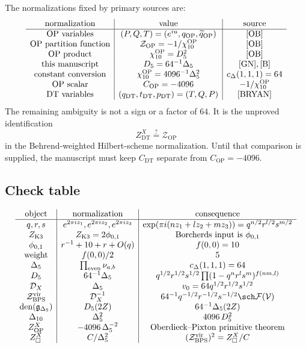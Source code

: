 The normalizations fixed by primary sources are:
$$
\begin{array}{c|c|c}
\hbox{normalization} & \hbox{value} & \hbox{source}\\
\hline
\hbox{OP variables} &
(P,Q,T)=(e^{iu},q_{\mathrm{OP}},\widetilde q_{\mathrm{OP}})
& \cite[Theorem 1]{OB}\\
\hbox{OP partition function} &
\mathcal Z_{\mathrm{OP}}=-1/\chi_{10}^{\mathrm{OP}}
& \cite[Theorem 1]{OB}\\
\hbox{OP product} &
\chi_{10}^{\mathrm{OP}}=D_5^2
& \cite[(3)]{OB}\\
\hbox{this manuscript} &
D_5=64^{-1}\Delta_5
& \cite{GN},\cite{B}\\
\hbox{constant conversion} &
\chi_{10}^{\mathrm{OP}}=4096^{-1}\Delta_5^2
& c_\Delta(1,1,1)=64\\
\hbox{OP scalar} &
C_{\mathrm{OP}}=-4096
& -1/\chi_{10}^{\mathrm{OP}}\\
\hbox{DT variables} &
(q_{\mathrm{DT}},t_{\mathrm{DT}},p_{\mathrm{DT}})=(T,Q,P)
& \cite[Definition 2.1]{BRYAN}
\end{array}
$$
The remaining ambiguity is not a sign or a factor of $64$.  It is the
unproved identification
$$
Z^X_{\mathrm{DT}}
\stackrel{?}{=}
\mathcal Z_{\mathrm{OP}}
$$
in the Behrend-weighted Hilbert-scheme normalization.  Until that
comparison is supplied, the manuscript must keep $C_{\mathrm{DT}}$
separate from $C_{\mathrm{OP}}=-4096$.

\subsection{Check table}

$$
\begin{array}{c|c|c}
\hbox{object} & \hbox{normalization} & \hbox{consequence}\\
\hline
q,r,s
& e^{2\pi iz_1},e^{2\pi iz_2},e^{2\pi iz_3}
& \exp(\pi i(nz_1+lz_2+mz_3))=q^{n/2}r^{l/2}s^{m/2}\\
Z_{\mathrm{K3}}
& Z_{\mathrm{K3}}=2\phi_{0,1}
& \hbox{Borcherds input is }\phi_{0,1}\\
\phi_{0,1}
& r^{-1}+10+r+O(q)
& f(0,0)=10\\
\hbox{weight}
& f(0,0)/2
& 5\\
\Delta_5
& \prod_{\mathrm{even}}\nu_{a,b}
& c_\Delta(1,1,1)=64\\
D_5
& 64^{-1}\Delta_5
& q^{1/2}r^{1/2}s^{1/2}\prod(1-q^nr^ls^m)^{f(nm,l)}\\
\mathcal D_X
& \Delta_5
& v_0=64q^{1/2}r^{1/2}s^{1/2}\\
\mathcal Z_{\mathrm{BPS}}^{\mathrm{vir}}
& \mathcal D_X^{-1}
& 64^{-1}q^{-1/2}r^{-1/2}s^{-1/2}\sch\mathcal F(\mathcal V)\\
\operatorname{den}(\mathfrak g_{\Delta_5})
& D_5(2Z)
& 64^{-1}\Delta_5(2Z)\\
\Delta_{10}
& \Delta_5^2
& 4096\,D_5^2\\
Z^X_{\mathrm{OP}}
& -4096\,\Delta_5^{-2}
& \hbox{Oberdieck--Pixton primitive theorem}\\
Z^X_{\square}
& C/\Delta_5^2
& (\mathcal Z_{\mathrm{BPS}}^{\mathrm{vir}})^2=Z^X_{\square}/C
\end{array}
$$
